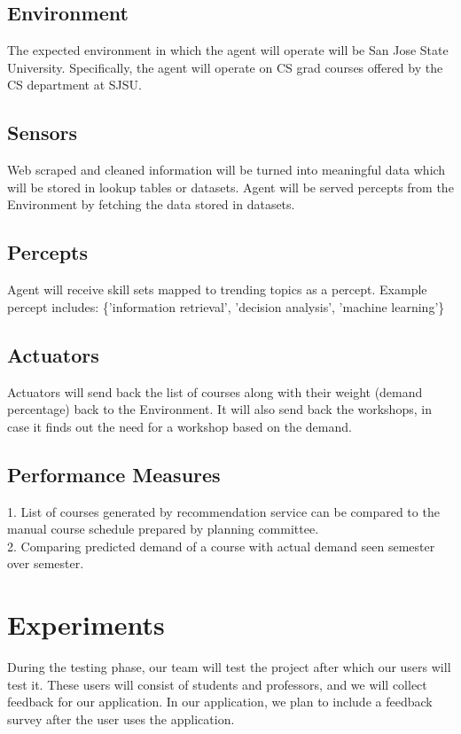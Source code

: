 \documentclass{article}
\begin{document}
\subsection{Environment}
The expected environment in which the agent will operate will be San Jose State University. Specifically, the agent will operate on CS grad courses offered by the CS department at SJSU. 

\subsection{Sensors}
Web scraped and cleaned information will be turned into meaningful data which will be stored in lookup tables or datasets.
Agent will be served percepts from the Environment by fetching the data stored in datasets. 

\subsection{Percepts}
Agent will receive skill sets mapped to trending topics as a percept. Example percept includes: 
\{'information retrieval', 'decision analysis', 'machine learning'\}

\subsection{Actuators}
Actuators will send back the list of courses along with their weight (demand percentage) back to the Environment. It will also send back the workshops, in case it finds out the need for a workshop based on the demand.

\subsection{Performance Measures}
1. List of courses generated by recommendation service can be compared to the manual course schedule prepared by planning committee.\\
2. Comparing predicted demand of a course with actual demand seen semester over semester.\\

\section{Experiments}
During the testing phase, our team will test the project after which our users will test it. These users will consist of students and professors, and we will collect feedback for our application. In our application, we plan to include a feedback survey after the user uses the application. 

 

\end{document}
